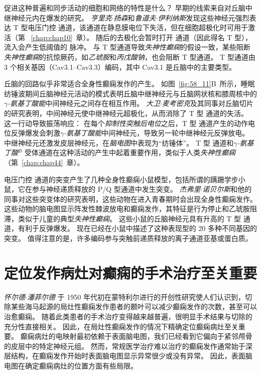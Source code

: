 促进这种普遍和同步活动的细胞和网络的特性是什么？
早期的线索来自对丘脑中继神经元内在爆发的研究。
\textit{亨里克$\cdot$扬森}和\textit{鲁道夫$\cdot$伊利纳斯}发现这些神经元强烈表达 T 型电压门控  通道，该通道在静息膜电位下失活，但在细胞超极化时可用于激活（第 ~\ref{chap:chap10}~章）。
随后的去极化会暂时打开  通道（因此得名 T 型）， 流入会产生低阈值的  脉冲。
与 T 型通道导致\textit{失神性癫痫}的假设一致，某些阻断\textit{失神性癫痫}的抗惊厥药，如\textit{乙琥胺}和\textit{丙戊酸钠}，也会阻断 T 型通道。
T 型通道由 3 个相关基因（Cav3.1–Cav3.3）编码，其中 Cav3.1 是丘脑中的主要类型。


丘脑的回路似乎非常适合全身性癫痫发作的产生。
如图~\ref{fig:58_11}B~所示，睡眠纺锤波期间丘脑神经元活动的模式表明丘脑中继神经元与丘脑网状核和膝周核中的\textit{$\gamma$-氨基丁酸能}中间神经元之间存在相互作用。
\textit{大卫$\cdot$麦考密克}及其同事对丘脑切片的研究表明，中间神经元使中继神经元超极化，从而消除了 T 型  通道的失活。
这一行动导致振荡响应：
在每个\textit{抑制性突触后电位}之后，T 型  通道产生的动作电位反弹爆发会刺激\textit{$\gamma$-氨基丁酸能}中间神经元，导致另一轮中继神经元反弹放电。
中继神经元还激发皮层神经元，在\textit{脑电图}中表现为“纺锤体”。
T 型  通道和\textit{$\gamma$-氨基丁酸}$^B$ 受体通道在这种活动的产生中起着重要作用，类似于人类\textit{失神性癫痫}（第~\ref{chap:chap44}~章）。


电压门控  通道的突变产生了几种全身性癫痫小鼠模型，包括所谓的蹒跚学步小鼠，它在参与神经递质释放的 P/Q 型通道中发生突变。
\textit{杰弗里$\cdot$诺贝尔斯}和他的同事对这些突变体的研究表明，这些动物在进入青春期时会出现全身性癫痫发作。
这些动物的脑电图显示阵发性棘波放电和癫痫发作，其特征是行为停止和乙琥胺阻滞，类似于儿童的典型\textit{失神性癫痫}。
这些小鼠的丘脑神经元具有升高的 T 型  通道，有利于反弹爆发。
现在已经在小鼠中描述了这种表现型的 20 多种不同基因的突变。
值得注意的是，许多编码参与突触前递质释放的离子通道亚基或蛋白质。



\section{定位发作病灶对癫痫的手术治疗至关重要}

\textit{怀尔德$\cdot$潘菲尔德 }于 1950 年代初在蒙特利尔进行的开创性研究使人们认识到，切除某些海马起源的局灶性癫痫发作患者的颞叶可以减少癫痫发作的次数，甚至可以治愈癫痫。
随着此类患者的手术治疗变得越来越普遍，很明显手术结果与切除的充分性直接相关。
因此，在局灶性癫痫发作的情况下精确定位癫痫病灶至关重要。
癫痫病灶的电映射最初依赖于表面脑电图，我们已经看到它偏向于紧邻颅骨的皮层中的特定神经元组。
然而，常规医学治疗难以治疗的癫痫发作通常始于深层结构，在癫痫发作开始时表面脑电图显示异常很少或没有异常。
因此，表面脑电图在确定癫痫病灶的位置方面有些局限。



